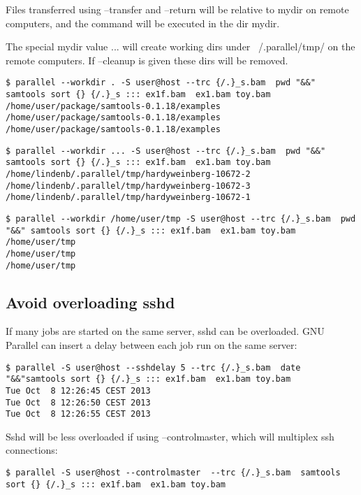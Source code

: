 \documentclass{article}
\begin{document}
Files transferred using --transfer and --return will be relative to mydir on remote computers, and the command will be executed in the dir mydir.

The special mydir value ... will create working dirs under ~/.parallel/tmp/ on the remote computers. If --cleanup is given these dirs will be removed.

\begin{lstlisting}
$ parallel --workdir . -S user@host --trc {/.}_s.bam  pwd "&&" samtools sort {} {/.}_s ::: ex1f.bam  ex1.bam toy.bam
/home/user/package/samtools-0.1.18/examples
/home/user/package/samtools-0.1.18/examples
/home/user/package/samtools-0.1.18/examples
\end{lstlisting}

\begin{lstlisting}
$ parallel --workdir ... -S user@host --trc {/.}_s.bam  pwd "&&" samtools sort {} {/.}_s ::: ex1f.bam  ex1.bam toy.bam
/home/lindenb/.parallel/tmp/hardyweinberg-10672-2
/home/lindenb/.parallel/tmp/hardyweinberg-10672-3
/home/lindenb/.parallel/tmp/hardyweinberg-10672-1
\end{lstlisting}


\begin{lstlisting}
$ parallel --workdir /home/user/tmp -S user@host --trc {/.}_s.bam  pwd "&&" samtools sort {} {/.}_s ::: ex1f.bam  ex1.bam toy.bam
/home/user/tmp
/home/user/tmp
/home/user/tmp
\end{lstlisting}


\subsection{Avoid overloading sshd}
If many jobs are started on the same server, sshd can be overloaded. GNU Parallel can insert a delay between each job run on the same server:

\begin{lstlisting}
$ parallel -S user@host --sshdelay 5 --trc {/.}_s.bam  date "&&"samtools sort {} {/.}_s ::: ex1f.bam  ex1.bam toy.bam
Tue Oct  8 12:26:45 CEST 2013
Tue Oct  8 12:26:50 CEST 2013
Tue Oct  8 12:26:55 CEST 2013
\end{lstlisting}
Sshd will be less overloaded if using --controlmaster, which will multiplex ssh connections:
\begin{lstlisting}
$ parallel -S user@host --controlmaster  --trc {/.}_s.bam  samtools sort {} {/.}_s ::: ex1f.bam  ex1.bam toy.bam
\end{lstlisting}
\end{document}
